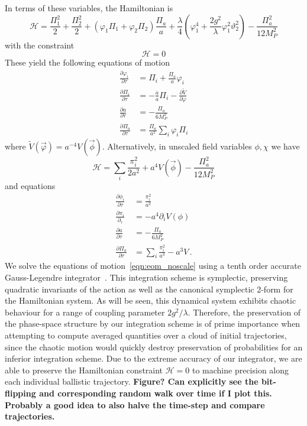 In terms of these variables, the Hamiltonian is
\begin{equation}
  \mathcal{H} = \frac{\Pi_1^2}{2} + \frac{\Pi_2^2}{2} + \left(\varphi_1\Pi_1 + \varphi_2\Pi_2\right)\frac{\Pi_a}{a} + \frac{\lambda}{4}\left(\varphi_1^4 + \frac{2g^2}{\lambda}\varphi_1^2\vartheta_2^2 \right) - \frac{\Pi_a^2}{12 M_P^2}
\end{equation}
with the constraint
\begin{equation}
  \mathcal{H} = 0
\end{equation}
These yield the following equations of motion
\begin{align}\label{eqn:eom_scale}
  \frac{\partial\varphi_i}{\partial\tau} &= \Pi_i + \frac{\Pi_a}{a}\varphi_i \\
  \frac{\partial\Pi_i}{\partial\tau}     &= -\frac{\dot{a}}{a}\Pi_i - \frac{\partial \tilde{V}}{\partial\varphi} \\
  \frac{\partial a}{\partial\tau}        &= -\frac{\Pi_a}{6M_P^2} \\
  \frac{\partial\Pi_a}{\partial\tau}     &= \frac{\Pi_a}{a^2}\sum_i\varphi_i\Pi_i
\end{align}
where $\tilde{V}(\vec{\varphi}) = a^{-4}V(\vec{\phi})$.
Alternatively, in unscaled field variables $\phi,\chi$ we have
\begin{equation}
  \mathcal{H} = \sum_i\frac{\pi_i^2}{2a^2} + a^4V(\vec{\phi}) - \frac{\Pi_a^2}{12M_P^2}
\end{equation}
and equations
\begin{align}\label{eqn:eom_noscale}
  \frac{\partial\phi_i}{\partial\tau} &= \frac{\pi_i^2}{a^2} \\
  \frac{\partial\pi_i}{\partial_\tau} &= -a^4 \partial_iV(\phi) \\
  \frac{\partial a}{\partial\tau}     &= -\frac{\Pi_a}{6M_P^2} \\
  \frac{\partial\Pi_a}{\partial\tau}  &= \sum_i\frac{\pi_i^2}{a^3} - a^3V \, .
\end{align}
We solve the equations of motion~\eqref{eqn:eom_noscale} using a tenth order accurate Gauss-Legendre integrator~\cite{Butcher,Braden}.
This integration scheme is symplectic, preserving quadratic invariants of the action as well as the canonical symplectic 2-form for the Hamiltonian system.
As will be seen, this dynamical system exhibits chaotic behaviour for a range of coupling parameter $2g^2/\lambda$.
Therefore, the preservation of the phase-space structure by our integration scheme is of prime importance when attempting to compute averaged quantities over a cloud of initial trajectories,
since the chaotic motion would quickly destroy preservation of probabilities for an inferior integration scheme.
Due to the extreme accuracy of our integrator, we are able to preserve the Hamiltonian constraint $\mathcal{H}=0$ to machine precision along each individual ballistic trajectory.
{\bf Figure?  Can explicitly see the bit-flipping and corresponding random walk over time if I plot this.  Probably a good idea to also halve the time-step and compare trajectories.}

